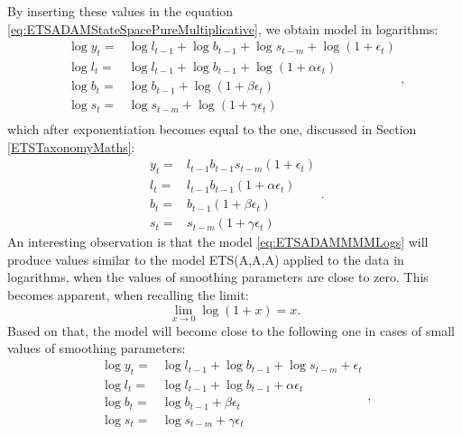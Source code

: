 \documentclass[
]{book}
\theoremstyle{definition}
\theoremstyle{definition}
\theoremstyle{definition}
\theoremstyle{definition}
\theoremstyle{remark}
\begin{document}
By inserting these values in the equation \eqref{eq:ETSADAMStateSpacePureMultiplicative}, we obtain model in logarithms:
\begin{equation}
    \begin{aligned}
        \log y_t = & \log l_{t-1} + \log b_{t-1} + \log s_{t-m} + \log \left(1 + \epsilon_{t} \right) \\
        \log l_{t} = & \log l_{t-1} + \log b_{t-1} + \log( 1  + \alpha \epsilon_{t}) \\ 
        \log b_{t} = & \log b_{t-1} + \log( 1  + \beta \epsilon_{t}) \\
        \log s_{t} = & \log s_{t-m} + \log( 1  + \gamma \epsilon_{t}) \\
    \end{aligned} ,
    \label{eq:ETSADAMMMMLogs}
\end{equation}
which after exponentiation becomes equal to the one, discussed in Section \ref{ETSTaxonomyMaths}:
\begin{equation}
  \begin{aligned}
    y_{t} = & l_{t-1} b_{t-1} s_{t-m} (1 + \epsilon_t) \\
    l_t = & l_{t-1} b_{t-1} (1 + \alpha \epsilon_t) \\
    b_t = & b_{t-1} (1 + \beta \epsilon_t) \\
    s_t = & s_{t-m} (1 + \gamma \epsilon_t) 
  \end{aligned}.
  \label{eq:ETSADAMMMM}
\end{equation}
An interesting observation is that the model \eqref{eq:ETSADAMMMMLogs} will produce values similar to the model ETS(A,A,A) applied to the data in logarithms, when the values of smoothing parameters are close to zero. This becomes apparent, when recalling the limit:
\begin{equation}
  \lim\limits_{x \to 0}\log(1+x) = x .
  \label{eq:limitOf1x}
\end{equation}
Based on that, the model will become close to the following one in cases of small values of smoothing parameters:
\begin{equation}
    \begin{aligned}
        \log y_t = & \log l_{t-1} + \log b_{t-1} + \log s_{t-m} + \epsilon_{t} \\
        \log l_{t} = & \log l_{t-1} + \log b_{t-1} + \alpha \epsilon_{t} \\ 
        \log b_{t} = & \log b_{t-1} + \beta \epsilon_{t} \\
        \log s_{t} = & \log s_{t-m} + \gamma \epsilon_{t} \\
    \end{aligned} ,
    \label{eq:ETSADAMMMMLogsEquivalent}
\end{equation}
\end{document}
